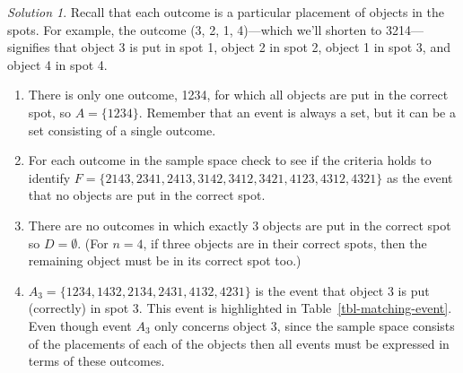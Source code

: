 \documentclass[
  letterpaper,
  DIV=11,
  numbers=noendperiod]{scrreprt}
\providecommand{\tightlist}{%
  \setlength{\itemsep}{0pt}\setlength{\parskip}{0pt}}
\theoremstyle{plain}
\theoremstyle{definition}
\theoremstyle{definition}
\theoremstyle{definition}
\theoremstyle{remark}
\newtheorem{refsolution}{Solution}[chapter]
\begin{document}
\begin{tcolorbox}[enhanced jigsaw, opacityback=0, rightrule=.15mm, coltitle=black, colframe=quarto-callout-tip-color-frame, toprule=.15mm, colbacktitle=quarto-callout-tip-color!10!white, opacitybacktitle=0.6, left=2mm, toptitle=1mm, breakable, title={Solution (click to expand)}, bottomtitle=1mm, colback=white, leftrule=.75mm, titlerule=0mm, arc=.35mm, bottomrule=.15mm]

\begin{refsolution}
Recall that each outcome is a particular placement of objects in the
spots. For example, the outcome (3, 2, 1, 4)---which we'll shorten to
3214---signifies that object 3 is put in spot 1, object 2 in spot 2,
object 1 in spot 3, and object 4 in spot 4.

\begin{enumerate}
\def\labelenumi{\arabic{enumi}.}
\tightlist
\item
  There is only one outcome, 1234, for which all objects are put in the
  correct spot, so \(A=\{1234\}\). Remember that an event is always a
  set, but it can be a set consisting of a single outcome.
\item
  For each outcome in the sample space check to see if the criteria
  holds to identify
  \(F=\{2143, 2341, 2413, 3142, 3412, 3421, 4123, 4312, 4321\}\) as the
  event that no objects are put in the correct spot.
\item
  There are no outcomes in which exactly 3 objects are put in the
  correct spot so \(D=\emptyset\). (For \(n=4\), if three objects are in
  their correct spots, then the remaining object must be in its correct
  spot too.)
\item
  \(A_3=\{1234, 1432, 2134, 2431, 4132, 4231\}\) is the event that
  object 3 is put (correctly) in spot 3. This event is highlighted in
  Table~\ref{tbl-matching-event}. Even though event \(A_3\) only
  concerns object 3, since the sample space consists of the placements
  of each of the objects then all events must be expressed in terms of
  these outcomes.
\end{enumerate}

\label{sol-matching-event}

\end{refsolution}

\end{tcolorbox}
\end{document}
